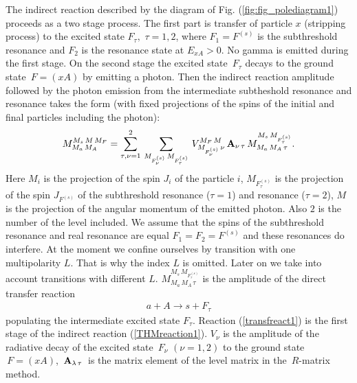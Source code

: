 \documentclass[prl,unsortedaddress,groupedaddress,twocolumn,amsmath,amsfonts,amssymb,showpacs,floatfix,nofootinbib]{revtex4}
\begin{document}
The indirect reaction described by the diagram of Fig. (\ref{fig:fig_polediagram1})  proceeds as a two stage process. The first part is transfer of particle $x$ (stripping process) to the excited state $F_{\tau},\,\,\tau=1,2$, where $F_{1} =F^{(s)}$ is the subthreshold resonance and $F_{2}$ is the resonance state at $E_{xA} >0$.  No gamma is emitted during the first stage. On the second stage the excited state $\,F_{\tau}$ decays to the ground state $\,F=(xA)$ by emitting a photon.
Then the indirect reaction amplitude followed by the photon emission from the intermediate subtheshold resonance and resonance takes the form (with fixed projections of the spins of the initial and final particles including the photon):
\begin{align}
M_{M_{a}\,M_{A}}^{M_{s}\,M\,M_{F}} = \sum\limits_{\tau, \nu =1}^{2}\,\sum\limits_{M_{F_{\nu}^{(s)}}\,M_{F_{\tau}^{(s)}}}\, V_{M_{F_{\nu}^{(s)}}\,\nu}^{M_{F}\,M}\,{\rm {\bf A}}_{\nu\,\tau}\,M_{M_{a}\,M_{A}\,\tau}^{M_{s}\,M_{  F_{\tau}^{(s)}}}.
\label{THradamplfull1}
\end{align}
Here $M_{i}$ is the projection of the spin $J_{i}$ of the particle $i$,   $M_{F_{\tau}^{(s)}}$ is the projection of the spin $J_{F^{(s)}}$ of the subthreshold resonance ($\tau =1$) and resonance ($\tau=2$), $M$ is the projection of the angular momentum of the emitted photon. Also $2$ is the number of the level included. We assume that the spins of the subthreshold resonance and real resonance are equal $F_{1} = F_{2}= F^{(s)}$ and these resonances do interfere. At the moment we confine ourselves by transition with one multipolarity $L$. That is why the index $L$ is omitted. Later on we take into account transitions with different $L$.
$M_{M_{a}\,M_{A}\,\tau }^{M_{s}\,M_{F_{\tau}^{(s)}}}$ is the amplitude of the direct transfer reaction 
\begin{align}
a+ A \to s+ F_{\tau}
\label{transfreact1}
\end{align} 
populating the intermediate excited state $F_{\tau}$. Reaction (\ref{transfreact1}) is the first stage of the indirect reaction (\ref{THMreaction1}).
$V_{\nu}$ is the amplitude of the radiative decay of the excited state  $\,F_{\nu} \,\,(\nu=1,2)$ to the ground state $\,F=(xA)$, $\,{\rm {\bf A}}_{\lambda\,\tau}\,$ is the matrix element of the level matrix in the $\,R$-matrix method.  
\end{document}
